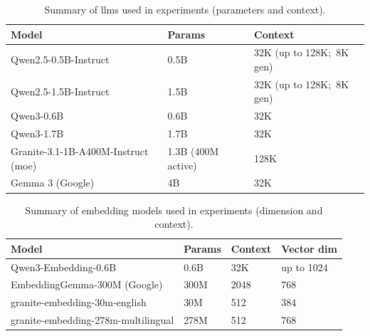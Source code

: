 \begin{table}
  \centering
  \scriptsize
  \caption{Summary of \glspl{llm} used in experiments (parameters and
  context).}\label{tab:llm-summary}
    \begin{tabularx}{\textwidth}{Xll}
    \toprule
    \textbf{Model} & \textbf{Params} & \textbf{Context} \\
    \midrule
    Qwen2.5-0.5B-Instruct & 0.5B & 32K (up to 128K;\ 8K gen) \\
    Qwen2.5-1.5B-Instruct & 1.5B & 32K (up to 128K;\ 8K gen) \\
    Qwen3-0.6B & 0.6B & 32K \\
    Qwen3-1.7B & 1.7B & 32K \\
    Granite-3.1-1B-A400M-Instruct (\gls{moe}) & 1.3B (400M active) & 128K \\
    Gemma 3 (Google) & 4B & 32K \\
    \bottomrule
  \end{tabularx}
\end{table}

\begin{table}
  \centering
  \scriptsize
  \caption{Summary of embedding models used in experiments
  (dimension and context).}\label{tab:embedding-summary}
  \begin{tabularx}{\textwidth}{Xlll}
    \toprule
    \textbf{Model} & \textbf{Params} & \textbf{Context} &
    \textbf{Vector dim} \\
    \midrule
    Qwen3-Embedding-0.6B & 0.6B & 32K & up to 1024 \\
    EmbeddingGemma-300M (Google) & 300M & 2048 & 768 \\
    granite-embedding-30m-english & 30M & 512 & 384 \\
    granite-embedding-278m-multilingual & 278M & 512 & 768 \\
    \bottomrule
  \end{tabularx}
\end{table}

